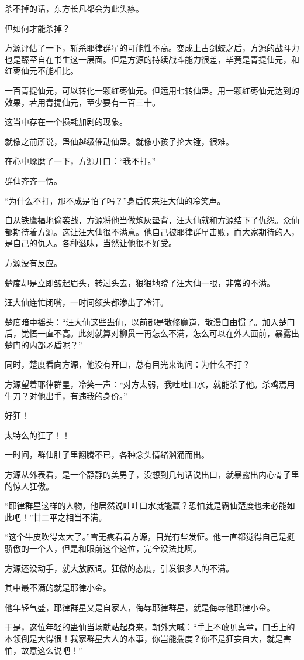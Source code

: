 \begin{this_body}
杀不掉的话，东方长凡都会为此头疼。

但如何才能杀掉？

方源评估了一下，斩杀耶律群星的可能性不高。变成上古剑蛟之后，方源的战斗力也是臻至自在书生这一层面。但是方源的持续战斗能力很差，毕竟是青提仙元，和红枣仙元不能相比。

一百青提仙元，可以转化一颗红枣仙元。但运用七转仙蛊。用一颗红枣仙元达到的效果，若用青提仙元，至少要有一百三十。

这当中存在一个损耗加剧的现象。

就像之前所说，蛊仙越级催动仙蛊。就像小孩子抡大锤，很难。

在心中琢磨了一下，方源开口：“我不打。”

群仙齐齐一愣。

“为什么不打，那不成是怕了吗？”身后传来汪大仙的冷笑声。

自从铁鹰福地偷袭战，方源将他当做炮灰垫背，汪大仙就和方源结下了仇怨。众仙都期待着方源。这让汪大仙很不满意。他自己被耶律群星击败，而大家期待的人，是自己的仇人。各种滋味，当然让他很不好受。

方源没有反应。

楚度却是立即皱起眉头，转过头去，狠狠地瞪了汪大仙一眼，非常的不满。

汪大仙连忙闭嘴，一时间额头都渗出了冷汗。

楚度暗中摇头：“汪大仙这些蛊仙，以前都是散修魔道，散漫自由惯了。加入楚门后，觉悟一直不高。此刻就算对柳贯一再怎么不满，怎么可以在外人面前，暴露出楚门的内部矛盾呢？”

同时，楚度看向方源，他没有开口，总有目光来询问：为什么不打？

方源望着耶律群星，冷笑一声：“对方太弱，我吐吐口水，就能杀了他。杀鸡焉用牛刀？对他出手，有违我的身价。”

好狂！

太特么的狂了！！

一时间，群仙肚子里翻腾不已，各种念头情绪汹涌而出。

方源从外表看，是一个静静的美男子，没想到几句话说出口，就暴露出内心骨子里的惊人狂傲。

“耶律群星这样的人物，他居然说吐吐口水就能赢？恐怕就是霸仙楚度也未必能如此吧！”廿二平之相当不满。

“这个牛皮吹得太大了。”雪无痕看着方源，目光有些发怔。他一直都觉得自己是挺骄傲的一个人，但是和眼前这个这位，完全没法比啊。

方源还没动手，就大放厥词。狂傲的态度，引发很多人的不满。

其中最不满的就是耶律小金。

他年轻气盛，耶律群星又是自家人，侮辱耶律群星，就是侮辱他耶律小金。

于是，这位年轻的蛊仙当场就站起身来，朝外大喊：“手上不敢见真章，口舌上的本领倒是大得很！我家群星大人的本事，你岂能揣度？你不是狂妄自大，就是害怕，故意这么说吧！”

\end{this_body}
